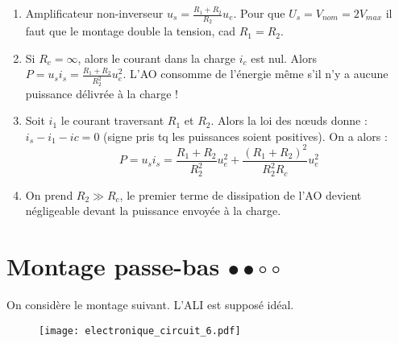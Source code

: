 \begin{correction}

\begin{enumerate}
	\item Amplificateur non-inverseur $u_s = \frac{R_1+R_2}{R_2}u_e$. Pour que $U_s = V_{nom}=2V_{max}$ il faut que le montage double la tension, cad $R_1=R_2$.
	\item  Si $R_c=\infty$, alors le courant dans la charge $i_c$ est nul. Alors $P=u_si_s= \frac{R_1+R_2}{R_2^2}u_e^2$. L'AO consomme de l'énergie même s'il n'y a aucune puissance délivrée à la charge !
	\item Soit $i_1$ le courant traversant $R_1$ et $R_2$. Alors la loi des nœuds donne : $i_s-i_1-ic=0$ (signe pris tq les puissances soient positives). On a alors :
	\begin{equation}
		P=u_si_s=\frac{R_1+R_2}{R_2^2}u_e^2+\frac{(R_1+R_2)^2}{R_2^2R_c}u_e^2
	\end{equation}
	\item On prend $R_2\gg R_c$, le premier terme de dissipation de l'AO devient négligeable devant la puissance envoyée à la charge.
\end{enumerate}

\end{correction}

\newpage

\section{Montage passe-bas $\bullet\bullet\circ\circ$}

On considère le montage suivant. L'ALI est supposé idéal.

\begin{figure}[!h]
\centering
\texttt{[image: electronique\_circuit\_6.pdf]}
\end{figure}

